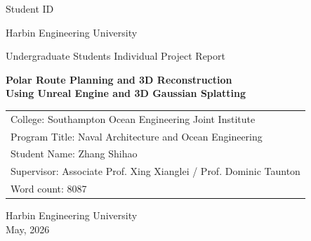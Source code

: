 \begin{titlepage}
\thispagestyle{empty}

\vspace*{0.5cm}

\begin{flushright}
\fontsize{12pt}{18pt}\selectfont
Student ID\hspace{1em}\underline{}
\end{flushright}

\vspace{1.5cm}

\begin{center}

{\fontsize{18pt}{27pt}\selectfont Harbin Engineering University}

\vspace{0.3cm}

{\fontsize{18pt}{27pt}\selectfont Undergraduate Students Individual Project Report}

\vspace{2.5cm}

{\fontsize{18pt}{27pt}\selectfont\bfseries
Polar Route Planning and 3D Reconstruction\\[0.5cm]
Using Unreal Engine and 3D Gaussian Splatting}

\vspace{4cm}

\begin{flushleft}
\hspace{2cm}
\fontsize{12pt}{18pt}\selectfont
\begin{tabular}{@{}l@{}}
College: Southampton Ocean Engineering Joint Institute \\[0.4cm]
Program Title: Naval Architecture and Ocean Engineering \\[0.4cm]
Student Name: Zhang Shihao \\[0.4cm]
Supervisor: Associate Prof. Xing Xianglei / Prof. Dominic Taunton \\[0.4cm]
Word count: 8087 \\
\end{tabular}
\end{flushleft}

\vfill

{\fontsize{12pt}{18pt}\selectfont Harbin Engineering University}\\[0.5cm]
{\fontsize{12pt}{18pt}\selectfont May, 2026}

\end{center}
\end{titlepage}
